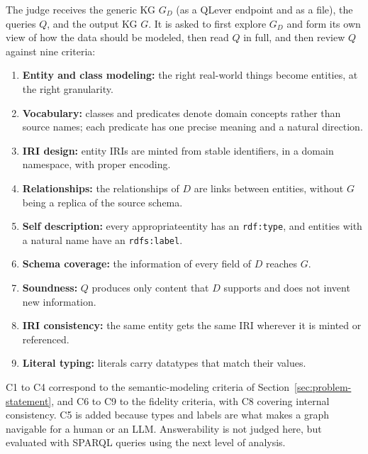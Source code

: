 The judge receives the generic KG \(G_D\) (as a QLever endpoint and as a file), the queries \(Q\), and the output KG \(G\). It is asked to first explore \(G_D\) and form its own view of how the data should be modeled, then read \(Q\) in full, and then review \(Q\) against nine criteria:
\begin{enumerate}[label=\textbf{C\arabic*.}, leftmargin=*, itemsep=2pt]
  \item \textbf{Entity and class modeling:} the right real-world things become entities, at the right granularity.
  \item \textbf{Vocabulary:} classes and predicates denote domain concepts rather than source names; each predicate has one precise meaning and a natural direction.
  \item \textbf{IRI design:} entity IRIs are minted from stable identifiers, in a domain namespace, with proper encoding.
  \item \textbf{Relationships:} the relationships of \(D\) are links between entities, without \(G\) being a replica of the source schema.
  \item \textbf{Self description:} every appropriateentity has an \texttt{rdf:type}, and entities with a natural name have an \texttt{rdfs:label}.
  \item \textbf{Schema coverage:} the information of every field of \(D\) reaches \(G\).
  \item \textbf{Soundness:} \(Q\) produces only content that \(D\) supports and does not invent new information.
  \item \textbf{IRI consistency:} the same entity gets the same IRI wherever it is minted or referenced.
  \item \textbf{Literal typing:} literals carry datatypes that match their values.
\end{enumerate}
C1 to C4 correspond to the semantic-modeling criteria of Section~\ref{sec:problem-statement}, and C6 to C9 to the fidelity criteria, with C8 covering internal consistency. C5 is added because types and labels are what makes a graph navigable for a human or an LLM\@. Answerability is not judged here, but evaluated with SPARQL queries using the next level of analysis. 


